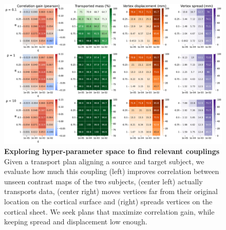 \begin{figure}[ht]
    \centering
    \includegraphics[width=1\columnwidth]{./Chapitre4/figures/cv_all_metrics_hcp_left_fugw.pdf}
    \caption{
        \textbf{Exploring hyper-parameter space to find relevant couplings}
        Given a transport plan aligning a source and target subject,
        we evaluate how much this coupling
        (left) improves correlation between unseen contrast maps
        of the two subjects,
        (center left) actually transports data,
        (center right) moves vertices far from their original location on the cortical surface
        and (right) spreads vertices on the cortical sheet.
        We seek plans that maximize correlation gain, while keeping spread and displacement low enough.
    }
    \label{fig:cv_metrics}
\end{figure}

